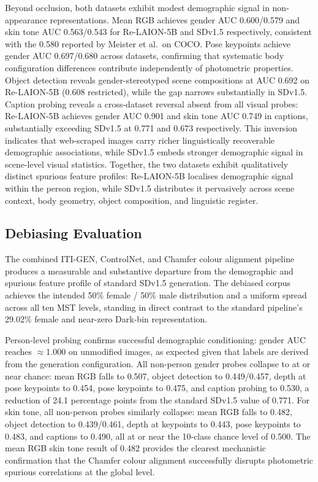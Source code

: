 Beyond occlusion, both datasets exhibit modest demographic signal in non-appearance
representations. Mean RGB achieves gender AUC 0.600/0.579 and skin tone AUC 0.563/0.543
for Re-LAION-5B and SDv1.5 respectively, consistent with the 0.580 reported by Meister
et al.\ on COCO. Pose keypoints achieve gender AUC 0.697/0.680 across datasets,
confirming that systematic body configuration differences contribute independently of
photometric properties. Object detection reveals gender-stereotyped scene compositions
at AUC 0.692 on Re-LAION-5B (0.608 restricted), while the gap narrows substantially
in SDv1.5. Caption probing reveals a cross-dataset reversal absent from all visual
probes: Re-LAION-5B achieves gender AUC 0.901 and skin tone AUC 0.749 in captions,
substantially exceeding SDv1.5 at 0.771 and 0.673 respectively. This inversion
indicates that web-scraped images carry richer linguistically recoverable demographic
associations, while SDv1.5 embeds stronger demographic signal in scene-level visual
statistics. Together, the two datasets exhibit qualitatively distinct spurious feature
profiles: Re-LAION-5B localises demographic signal within the person region, while
SDv1.5 distributes it pervasively across scene context, body geometry, object
composition, and linguistic register.

\subsection{Debiasing Evaluation}

The combined ITI-GEN, ControlNet, and Chamfer colour alignment pipeline produces a
measurable and substantive departure from the demographic and spurious feature profile
of standard SDv1.5 generation. The debiased corpus achieves the intended 50\% female /
50\% male distribution and a uniform spread across all ten MST levels, standing in
direct contrast to the standard pipeline's 29.02\% female and near-zero Dark-bin
representation.

Person-level probing confirms successful demographic conditioning: gender AUC reaches
$\approx$1.000 on unmodified images, as expected given that labels are derived from the
generation configuration. All non-person gender probes collapse to at or near chance:
mean RGB falls to 0.507, object detection to 0.449/0.457, depth at pose keypoints to
0.454, pose keypoints to 0.475, and caption probing to 0.530, a reduction of 24.1
percentage points from the standard SDv1.5 value of 0.771. For skin tone, all
non-person probes similarly collapse: mean RGB falls to 0.482, object detection to
0.439/0.461, depth at keypoints to 0.443, pose keypoints to 0.483, and captions to
0.490, all at or near the 10-class chance level of 0.500. The mean RGB skin tone result
of 0.482 provides the clearest mechanistic confirmation that the Chamfer colour
alignment successfully disrupts photometric spurious correlations at the global level.

